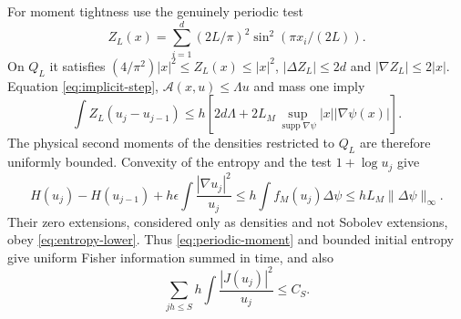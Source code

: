 \documentclass[11pt]{article}
\numberwithin{equation}{section}
\theoremstyle{definition}
\theoremstyle{remark}
\newcommand{\norm}[1]{\lVert #1\rVert}
\begin{document}
For moment tightness use the genuinely periodic test
\[
 Z_L(x)=\sum_{i=1}^d(2L/\pi)^2\sin^2(\pi x_i/(2L)).
\]
On $Q_L$ it satisfies
$(4/\pi^2)|x|^2\le Z_L(x)\le|x|^2$,
$|\Delta Z_L|\le2d$ and $|\nabla Z_L|\le2|x|$.
Equation \eqref{eq:implicit-step}, $\mathcal A(x,u)\le\Lambda u$ and
mass one imply
\begin{equation}\label{eq:periodic-moment}
 \int Z_L(u_j-u_{j-1})
 \le h\left[2d\Lambda+
       2L_M\sup_{\operatorname{supp}\nabla\psi}|x||\nabla\psi(x)|\right].
\end{equation}
The physical second moments of the densities restricted to $Q_L$ are
therefore uniformly bounded. Convexity of the entropy and the test
$1+\log u_j$ give
\begin{equation}\label{eq:discrete-entropy}
 H(u_j)-H(u_{j-1})+h\epsilon\int\frac{|\nabla u_j|^2}{u_j}
 \le h\int f_M(u_j)\Delta\psi\le hL_M\norm{\Delta\psi}_\infty.
\end{equation}
Their zero extensions, considered only as densities and not Sobolev
extensions, obey \eqref{eq:entropy-lower}. Thus \eqref{eq:periodic-moment}
and bounded initial entropy give uniform Fisher information summed in
time, and also
\begin{equation}\label{eq:discrete-action}
 \sum_{jh\le S}h\int\frac{|J(u_j)|^2}{u_j}\le C_S.
\end{equation}
\end{document}
